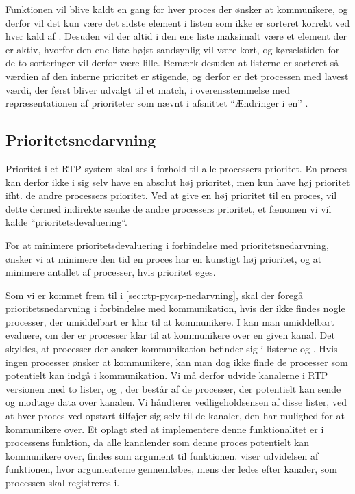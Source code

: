 Funktionen  vil blive kaldt en gang for hver proces der ønsker at kommunikere, og derfor vil det kun være det sidste element i listen som ikke er sorteret korrekt ved hver kald af . Desuden vil der altid i den ene liste maksimalt være et element der er aktiv, hvorfor den ene liste højst sandsynlig vil være kort, og kørselstiden for de to sorteringer vil derfor være lille. Bemærk desuden at listerne er sorteret så værdien af den interne prioritet er stigende, og derfor er det processen med lavest værdi, der først bliver udvalgt til et match, i overensstemmelse med repræsentationen af prioriteter som nævnt i afsnittet ``Ændringer i \sched en'' .


\subsection{Prioritetsnedarvning}
\label{sec:deadline-implementation-priorityinheritance}
Prioritet i et RTP system skal ses i forhold til alle processers prioritet. En proces kan derfor ikke i sig selv have en absolut høj prioritet, men kun have høj prioritet ifht. de andre processers prioritet. Ved at give en høj prioritet til  en proces, vil dette dermed  indirekte sænke de andre processers prioritet, et fænomen vi vil kalde ``prioritetsdevaluering``.

For at minimere prioritetsdevaluering i forbindelse med prioritetsnedarvning, ønsker vi at minimere den tid en proces har en kunstigt høj prioritet, og at minimere antallet af processer, hvis prioritet øges. 

Som vi er kommet frem til i \cref{sec:rtp-pycsp-nedarvning}, skal  der foregå  prioritetsnedarvning i forbindelse med kommunikation, hvis der ikke findes nogle processer, der umiddelbart er klar til at kommunikere.  I \pycsp kan man umiddelbart evaluere, om der er processer klar til at kommunikere over en given kanal. Det skyldes, at processer der ønsker kommunikation befinder sig i listerne  og . Hvis ingen processer ønsker at kommunikere, kan man dog ikke finde de processer som potentielt kan indgå i kommunikation.
Vi må derfor udvide kanalerne i RTP versionen med to lister,  og , der består af de processer, der potentielt kan sende og modtage data over kanalen. Vi håndterer vedligeholdsensen af disse lister, ved at hver proces ved opstart tilføjer sig selv til de kanaler, den har mulighed for at kommunikere over. Et oplagt sted at implementere denne funktionalitet er i processens    funktion, da alle kanalender som denne proces potentielt kan kommunikere over, findes som argument til   funktionen.  viser udvidelsen af funktionen, hvor argumenterne gennemløbes, mens der ledes efter kanaler, som processen skal registreres i.

